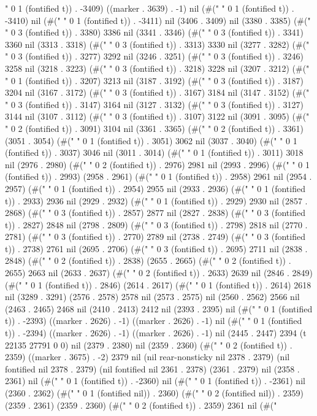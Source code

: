 " 0 1 (fontified t)) . -3409) ((marker . 3639) . -1) nil (#(" " 0 1 (fontified t)) . -3410) nil (#(" " 0 1 (fontified t)) . -3411) nil (3406 . 3409) nil (3380 . 3385) (#("   " 0 3 (fontified t)) . 3380) 3386 nil (3341 . 3346) (#("   " 0 3 (fontified t)) . 3341) 3360 nil (3313 . 3318) (#("   " 0 3 (fontified t)) . 3313) 3330 nil (3277 . 3282) (#("   " 0 3 (fontified t)) . 3277) 3292 nil (3246 . 3251) (#("   " 0 3 (fontified t)) . 3246) 3258 nil (3218 . 3223) (#("   " 0 3 (fontified t)) . 3218) 3228 nil (3207 . 3212) (#(" " 0 1 (fontified t)) . 3207) 3213 nil (3187 . 3192) (#("   " 0 3 (fontified t)) . 3187) 3204 nil (3167 . 3172) (#("   " 0 3 (fontified t)) . 3167) 3184 nil (3147 . 3152) (#("   " 0 3 (fontified t)) . 3147) 3164 nil (3127 . 3132) (#("   " 0 3 (fontified t)) . 3127) 3144 nil (3107 . 3112) (#("   " 0 3 (fontified t)) . 3107) 3122 nil (3091 . 3095) (#("  " 0 2 (fontified t)) . 3091) 3104 nil (3361 . 3365) (#("  " 0 2 (fontified t)) . 3361) (3051 . 3054) (#(" " 0 1 (fontified t)) . 3051) 3062 nil (3037 . 3040) (#(" " 0 1 (fontified t)) . 3037) 3046 nil (3011 . 3014) (#(" " 0 1 (fontified t)) . 3011) 3018 nil (2976 . 2980) (#("  " 0 2 (fontified t)) . 2976) 2981 nil (2993 . 2996) (#(" " 0 1 (fontified t)) . 2993) (2958 . 2961) (#(" " 0 1 (fontified t)) . 2958) 2961 nil (2954 . 2957) (#(" " 0 1 (fontified t)) . 2954) 2955 nil (2933 . 2936) (#(" " 0 1 (fontified t)) . 2933) 2936 nil (2929 . 2932) (#(" " 0 1 (fontified t)) . 2929) 2930 nil (2857 . 2868) (#("   " 0 3 (fontified t)) . 2857) 2877 nil (2827 . 2838) (#("   " 0 3 (fontified t)) . 2827) 2848 nil (2798 . 2809) (#("   " 0 3 (fontified t)) . 2798) 2818 nil (2770 . 2781) (#("   " 0 3 (fontified t)) . 2770) 2789 nil (2738 . 2749) (#("   " 0 3 (fontified t)) . 2738) 2761 nil (2695 . 2706) (#("   " 0 3 (fontified t)) . 2695) 2711 nil (2838 . 2848) (#("  " 0 2 (fontified t)) . 2838) (2655 . 2665) (#("  " 0 2 (fontified t)) . 2655) 2663 nil (2633 . 2637) (#("  " 0 2 (fontified t)) . 2633) 2639 nil (2846 . 2849) (#(" " 0 1 (fontified t)) . 2846) (2614 . 2617) (#(" " 0 1 (fontified t)) . 2614) 2618 nil (3289 . 3291) (2576 . 2578) 2578 nil (2573 . 2575) nil (2560 . 2562) 2566 nil (2463 . 2465) 2468 nil (2410 . 2413) 2412 nil (2393 . 2395) nil (#(" " 0 1 (fontified t)) . -2393) ((marker . 2626) . -1) ((marker . 2626) . -1) nil (#(" " 0 1 (fontified t)) . -2394) ((marker . 2626) . -1) ((marker . 2626) . -1) nil (2445 . 2447) 2394 (t 22135 27791 0 0) nil (2379 . 2380) nil (2359 . 2360) (#("  " 0 2 (fontified t)) . 2359) ((marker . 3675) . -2) 2379 nil (nil rear-nonsticky nil 2378 . 2379) (nil fontified nil 2378 . 2379) (nil fontified nil 2361 . 2378) (2361 . 2379) nil (2358 . 2361) nil (#(" " 0 1 (fontified t)) . -2360) nil (#(" " 0 1 (fontified t)) . -2361) nil (2360 . 2362) (#(" " 0 1 (fontified nil)) . 2360) (#("  " 0 2 (fontified nil)) . 2359) (2359 . 2361) (2359 . 2360) (#("  " 0 2 (fontified t)) . 2359) 2361 nil (#("
